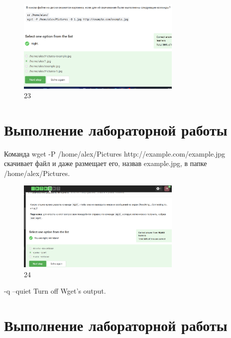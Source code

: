 \begin{figure}
\hypertarget{fig:023}{%
\centering
\includegraphics[width=0.7\textwidth,height=\textheight]{image/23.png}
\caption{23}\label{fig:023}
}
\end{figure}

\hypertarget{ux432ux44bux43fux43eux43bux43dux435ux43dux438ux435-ux43bux430ux431ux43eux440ux430ux442ux43eux440ux43dux43eux439-ux440ux430ux431ux43eux442ux44b-16}{%
\section{Выполнение лабораторной
работы}\label{ux432ux44bux43fux43eux43bux43dux435ux43dux438ux435-ux43bux430ux431ux43eux440ux430ux442ux43eux440ux43dux43eux439-ux440ux430ux431ux43eux442ux44b-16}}

Команда wget -P /home/alex/Pictures http://example.com/example.jpg
скачивает файл и даже размещает его, назвав example.jpg, в папке
/home/alex/Pictures.

\begin{figure}
\hypertarget{fig:024}{%
\centering
\includegraphics[width=0.7\textwidth,height=\textheight]{image/24.png}
\caption{24}\label{fig:024}
}
\end{figure}

-q --quiet Turn off Wget's output.

\hypertarget{ux432ux44bux43fux43eux43bux43dux435ux43dux438ux435-ux43bux430ux431ux43eux440ux430ux442ux43eux440ux43dux43eux439-ux440ux430ux431ux43eux442ux44b-17}{%
\section{Выполнение лабораторной
работы}\label{ux432ux44bux43fux43eux43bux43dux435ux43dux438ux435-ux43bux430ux431ux43eux440ux430ux442ux43eux440ux43dux43eux439-ux440ux430ux431ux43eux442ux44b-17}}

